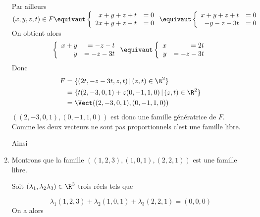 \documentclass[a4paper, 11pt,reqno]{article}
\begin{document}
\begin{correction}
\begin{enumerate}
Par ailleurs $(x,y,z,t)\in F \equivaut 
\left\{ \begin{array}{rr}
x+y+z+t&=0\\
2x+y+z-t&=0\\
\end{array}\right.\equivaut 
\left\{ \begin{array}{rr}
x+y+z+t&=0\\
-y-z-3t&=0\\
\end{array}\right.
$ 
On obtient alors 
$$\left\{ \begin{array}{rr}
x+y&=-z-t\\
y&=-z-3t\\
\end{array}\right. \equivaut \left\{ \begin{array}{rr}
x&=2t\\
y&=-z-3t\\
\end{array}\right. 
$$
Donc 
\begin{align*}
F&=\{ (2t,-z-3t,z,t)\, |\, (z,t)\in \R^2\}\\
&=\{ t(2,-3,0,1) +z(0,-1,1,0)\, |\, (z,t)\in \R^2\}\\
&= \Vect((2,-3,0,1),(0,-1,1,0))
\end{align*}
$((2,-3,0,1),(0,-1,1,0))$ est donc une famille génératrice de $F$. Comme les deux vecteurs ne sont pas proportionnels c'est une famille libre. 

Ainsi 

\item Montrons que la famille $((1,2,3),(1,0,1), (2,2,1))$ est une famille libre. 

Soit $(\lambda_1,\lambda_2 \lambda_3)\in \R^3$ trois réels tels que

$$\lambda_1(1,2,3)+ \lambda_2(1,0,1)+ \lambda_3(2,2,1) =(0,0,0)$$
On a alors 


\end{enumerate}
\end{correction}
\end{document}
